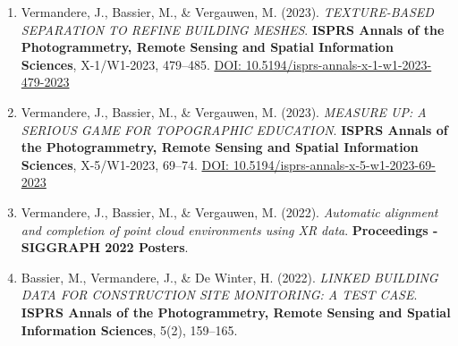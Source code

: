 \begin{enumerate}
    \item Vermandere, J., Bassier, M., \& Vergauwen, M. (2023). \textit{TEXTURE-BASED SEPARATION TO REFINE BUILDING MESHES}. \textbf{ISPRS Annals of the Photogrammetry, Remote Sensing and Spatial Information Sciences}, X-1/W1-2023, 479--485. \href{https://doi.org/10.5194/isprs-annals-x-1-w1-2023-479-2023}{DOI: 10.5194/isprs-annals-x-1-w1-2023-479-2023}

    \item Vermandere, J., Bassier, M., \& Vergauwen, M. (2023). \textit{MEASURE UP: A SERIOUS GAME FOR TOPOGRAPHIC EDUCATION}. \textbf{ISPRS Annals of the Photogrammetry, Remote Sensing and Spatial Information Sciences}, X-5/W1-2023, 69--74. \href{https://doi.org/10.5194/isprs-annals-x-5-w1-2023-69-2023}{DOI: 10.5194/isprs-annals-x-5-w1-2023-69-2023}
    
    \item Vermandere, J., Bassier, M., \& Vergauwen, M. (2022). \textit{Automatic alignment and completion of point cloud environments using XR data}. \textbf{Proceedings - SIGGRAPH 2022 Posters}.

    \item Bassier, M., Vermandere, J., \& De Winter, H. (2022). \textit{LINKED BUILDING DATA FOR CONSTRUCTION SITE MONITORING: A TEST CASE}. \textbf{ISPRS Annals of the Photogrammetry, Remote Sensing and Spatial Information Sciences}, 5(2), 159--165.

\end{enumerate}



\cleardoublepage

